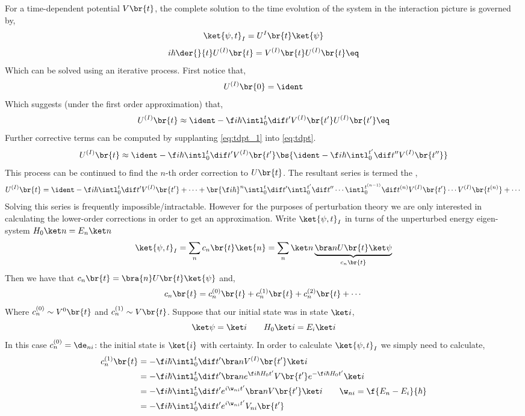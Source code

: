 \documentclass{article}
\begin{document}
For a time-dependent potential $V\br{t}$, the complete solution to the time evolution of the system in the interaction picture is governed by,
\[ \ket{\psi, t}_{I} = U^{I}\br{t} \ket{\psi} \]
\[ i \hbar \der{}{t} U^{(I)}\br{t} = V^{(I)}\br{t} U^{(I)}\br{t} \eq \label{eq:tdpt} \]
Which can be solved using an iterative process. First notice that,
\[ U^{(I)}\br{0} = \ident \]
Which suggests (under the first order approximation) that,
\[ U^{(I)}\br{t} \approx \ident - \f i \hbar \intl_{0}^{t} \dif t' V^{(I)}\br{t'}U^{(I)}\br{t'} \eq \label{eq:tdpt_1} \]
Further corrective terms can be computed by supplanting \cref{eq:tdpt_1} into \cref{eq:tdpt}.
\[ U^{(I)}\br{t} \approx \ident - \f i \hbar \intl_{0}^{t} \dif t' V^{(I)}\br{t'}\bs{\ident - \f i \hbar \intl_{0}^{t'} \dif t'' V^{(I)}\br{t''}} \]
This process can be continued to find the $n$-th order correction to $U\br{t}$. The resultant series is termed the ,
\[ U^{(I)}\br{t} = \ident - \f i \hbar \intl_{0}^{t} \dif t' V^{(I)}\br{t'} + \cdots + \br{\f i \hbar}^n \intl_{0}^{t} \dif t' \intl_{0}^{t'} \dif t'' \cdots \intl_{0}^{t^{(n-1)}} \dif t^{(n)} V^{(I)}\br{t'} \cdots V^{(I)}\br{t^{(n)}} + \cdots \]
Solving this series is frequently impossible/intractable. However for the purposes of perturbation theory we are only interested in calculating the lower-order corrections in order to get an approximation. Write $\ket{\psi, t}_I$ in turns of the unperturbed energy eigen-system $H_0 \ket n = E_n \ket n$
\[ \ket{\psi, t}_{I} = \sum_n c_n\br{t} \ket{n} = \sum_n \ket n \underbrace{\bra n U\br{t} \ket \psi}_{c_n\br{t}} \]
Then we have that $c_n\br{t} = \bra{n} U\br{t} \ket{\psi}$ and,
\[ c_n\br{t} = c_n^{(0)}\br{t} + c_n^{(1)}\br{t} + c_n^{(2)}\br{t} + \cdots\]
Where $c_n^{(0)} \sim V^{0}\br{t}$ and $c_n^{(1)} \sim V\br{t}$. Suppose that our initial state was in state $\ket i$,
\[ \ket \psi = \ket i \qquad H_0 \ket i = E_i \ket i \]
In this case $c_n^{(0)} = \de_{ni}$: the initial state is $\ket{i}$ with certainty. In order to calculate $\ket{\psi, t}_I$ we simply need to calculate,
\begin{align*}
    c_n^{(1)}\br{t}
    &= - \f i \hbar \intl_{0}^{t} \dif t' \bra n V^{(I)} \br{t'} \ket i \\
    &= - \f i \hbar \intl_{0}^{t} \dif t' \bra n e^{\f i \hbar H_0 t'} V \br{t'}  e^{-\f i \hbar H_0 t'}\ket i \\
    &= - \f i \hbar \intl_{0}^{t} \dif t' e^{i \w_{ni} t'}  \bra n V \br{t'}\ket i \qquad \w_{ni} = \f{E_n - E_i}{\hbar} \\
    &= - \f i \hbar \intl_{0}^{t} \dif t' e^{i \w_{ni} t'}  V_{ni}\br{t'}
\end{align*}
\end{document}
